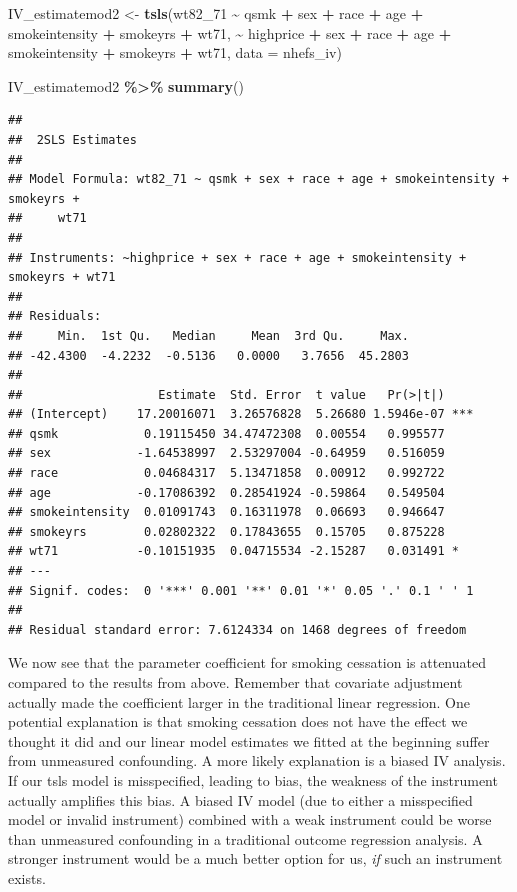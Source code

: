 \documentclass[
]{book}
\newenvironment{Shaded}{\begin{snugshade}}{\end{snugshade}}
\newcommand{\AttributeTok}[1]{\textcolor[rgb]{0.13,0.29,0.53}{#1}}
\newcommand{\FunctionTok}[1]{\textcolor[rgb]{0.13,0.29,0.53}{\textbf{#1}}}
\newcommand{\NormalTok}[1]{#1}
\newcommand{\OtherTok}[1]{\textcolor[rgb]{0.56,0.35,0.01}{#1}}
\newcommand{\SpecialCharTok}[1]{\textcolor[rgb]{0.81,0.36,0.00}{\textbf{#1}}}
\begin{document}
\begin{Shaded}
\begin{Highlighting}[]
\NormalTok{IV\_estimatemod2 }\OtherTok{\textless{}{-}} \FunctionTok{tsls}\NormalTok{(wt82\_71 }\SpecialCharTok{\textasciitilde{}}\NormalTok{ qsmk }\SpecialCharTok{+}\NormalTok{ sex }\SpecialCharTok{+}\NormalTok{ race }\SpecialCharTok{+}\NormalTok{ age }\SpecialCharTok{+} 
\NormalTok{                          smokeintensity }\SpecialCharTok{+}\NormalTok{ smokeyrs }\SpecialCharTok{+}\NormalTok{ wt71, }
                        \SpecialCharTok{\textasciitilde{}}\NormalTok{ highprice }\SpecialCharTok{+}\NormalTok{ sex }\SpecialCharTok{+}\NormalTok{ race }\SpecialCharTok{+}\NormalTok{ age }\SpecialCharTok{+} 
\NormalTok{                          smokeintensity }\SpecialCharTok{+}\NormalTok{ smokeyrs }\SpecialCharTok{+}\NormalTok{ wt71, }
                        \AttributeTok{data =}\NormalTok{ nhefs\_iv)}

\NormalTok{IV\_estimatemod2 }\SpecialCharTok{\%\textgreater{}\%}
  \FunctionTok{summary}\NormalTok{()}
\end{Highlighting}
\end{Shaded}

\begin{verbatim}
## 
##  2SLS Estimates
## 
## Model Formula: wt82_71 ~ qsmk + sex + race + age + smokeintensity + smokeyrs + 
##     wt71
## 
## Instruments: ~highprice + sex + race + age + smokeintensity + smokeyrs + wt71
## 
## Residuals:
##     Min.  1st Qu.   Median     Mean  3rd Qu.     Max. 
## -42.4300  -4.2232  -0.5136   0.0000   3.7656  45.2803 
## 
##                   Estimate  Std. Error  t value   Pr(>|t|)    
## (Intercept)    17.20016071  3.26576828  5.26680 1.5946e-07 ***
## qsmk            0.19115450 34.47472308  0.00554   0.995577    
## sex            -1.64538997  2.53297004 -0.64959   0.516059    
## race            0.04684317  5.13471858  0.00912   0.992722    
## age            -0.17086392  0.28541924 -0.59864   0.549504    
## smokeintensity  0.01091743  0.16311978  0.06693   0.946647    
## smokeyrs        0.02802322  0.17843655  0.15705   0.875228    
## wt71           -0.10151935  0.04715534 -2.15287   0.031491 *  
## ---
## Signif. codes:  0 '***' 0.001 '**' 0.01 '*' 0.05 '.' 0.1 ' ' 1
## 
## Residual standard error: 7.6124334 on 1468 degrees of freedom
\end{verbatim}

We now see that the parameter coefficient for smoking cessation is attenuated compared to the results from above. Remember that covariate adjustment actually made the coefficient larger in the traditional linear regression. One potential explanation is that smoking cessation does not have the effect we thought it did and our linear model estimates we fitted at the beginning suffer from unmeasured confounding. A more likely explanation is a biased IV analysis. If our tsls model is misspecified, leading to bias, the weakness of the instrument actually amplifies this bias. A biased IV model (due to either a misspecified model or invalid instrument) combined with a weak instrument could be worse than unmeasured confounding in a traditional outcome regression analysis. A stronger instrument would be a much better option for us, \emph{if} such an instrument exists.
\end{document}
